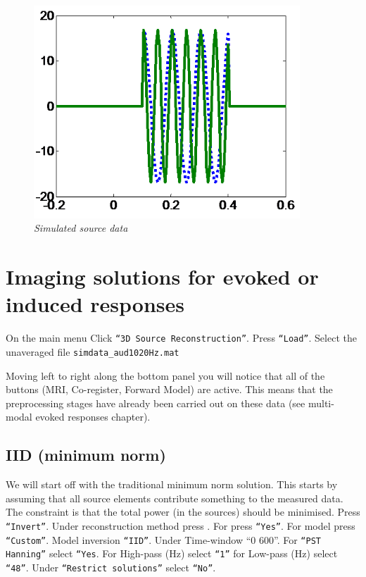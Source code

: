 \begin{figure}
\begin{center}
\includegraphics[width=100mm]{meg_sloc/Slide1}
\caption{\em Simulated source data \label{meg_sloc:fig:1}}
\end{center}
\end{figure}


\section{Imaging solutions for evoked or induced responses}

On the main menu Click \texttt{``3D Source Reconstruction''}. Press \texttt{``Load''}. Select the unaveraged file \texttt{simdata\_aud1020Hz.mat}

Moving left to right along the bottom panel you will notice that all of the buttons (MRI, Co-register, Forward Model) are active. This means that the preprocessing stages have already been carried out on these data (see multi-modal evoked responses chapter).

\subsection{IID (minimum norm)}
We will start off with the traditional minimum norm solution. This starts by assuming that all source elements contribute something to the measured data. The constraint is that the total power (in the sources) should be minimised.
Press \texttt{``Invert''}. Under reconstruction method press . For  press \texttt{``Yes''}. For model press \texttt{``Custom''}. Model inversion \texttt{``IID''}. Under Time-window ``0 600''. For \texttt{``PST Hanning''} select \texttt{``Yes}. For High-pass (Hz) select \texttt{``1''} for Low-pass (Hz) select \texttt{``48''}. Under \texttt{``Restrict solutions''} select \texttt{``No''}. 

